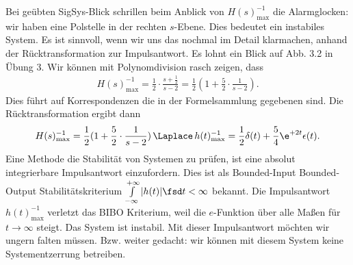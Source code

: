 \begin{ExCalc}
Bei geübten SigSys-Blick schrillen beim Anblick von $H(s)_\mathrm{max}^{-1}$
die Alarmglocken: wir haben eine Polstelle in der rechten $s$-Ebene.
Dies bedeutet ein instabiles System.
Es ist sinnvoll, wenn wir uns das nochmal im Detail klarmachen, anhand der
Rücktransformation zur Impulsantwort.
Es lohnt ein Blick auf Abb. 3.2 in Übung 3.
%
Wir können mit Polynomdivision rasch zeigen, dass
\begin{align}
H(s)_\mathrm{max}^{-1} = \frac{1}{2}\cdot\frac{s+\frac{1}{2}}{s-2}
= \frac{1}{2} ( 1 + \frac{5}{2}\cdot\frac{1}{s-2}).
\end{align}
Dies führt auf Korrespondenzen die in der Formelsammlung gegebenen
sind.
Die Rücktransformation ergibt dann
\begin{align}
H(s)_\mathrm{max}^{-1} = \frac{1}{2} ( 1 + \frac{5}{2}\cdot\frac{1}{s-2})
\,\Laplace\,
h(t)_\mathrm{max}^{-1} = \frac{1}{2}\delta(t) + \frac{5}{4}\e^{+2 t}\epsilon(t).
\end{align}
%
Eine Methode die Stabilität von Systemen zu prüfen, ist eine absolut integrierbare
Impulsantwort einzufordern. Dies ist als Bounded-Input Bounded-Output
Stabilitätskriterium
$\int\limits_{-\infty}^{+\infty} |h(t)|\fsd t < \infty$
bekannt.
Die Impulsantwort $h(t)_\mathrm{max}^{-1} $ verletzt das BIBO Kriterium, weil
die $e$-Funktion über alle Maßen für $t\to\infty$ steigt. Das System ist
instabil.
Mit dieser Impulsantwort möchten wir ungern falten müssen.
Bzw. weiter gedacht: wir können mit diesem System keine Systementzerrung betreiben.
\end{ExCalc}

